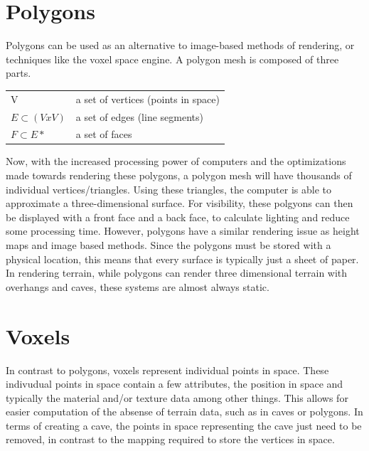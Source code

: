 \documentclass[10pt]{report}
\begin{document}
		\section{Polygons}
	
		Polygons can be used as an alternative to image-based methods of rendering, or techniques like the voxel space engine. A polygon mesh is composed of three parts.
		
		\begin{center}
			\begin{tabular}{ l l } 
				V & a set of vertices (points in space)\\ 
				$E {\subset} (V x V)$ & a set of edges (line segments)\\ 
				$F {\subset} E*$  & a set of faces \\
			\end{tabular}
		\end{center}
	
		Now, with the increased processing power of computers and the optimizations made towards rendering these polygons, a polygon mesh will have thousands of individual vertices/triangles. Using these triangles, the computer is able to approximate a three-dimensional surface. For visibility, these polgyons can then be displayed with a front face and a back face, to calculate lighting and reduce some processing time. However, polygons have a similar rendering issue as height maps and image based methods. Since the polygons must be stored with a physical location, this means that every surface is typically just a sheet of paper. In rendering terrain, while polygons can render three dimensional terrain with overhangs and caves, these systems are almost always static. 
		
	
		\section{Voxels}
	
		In contrast to polygons, voxels represent individual points in space. These indivudual points in space contain a few attributes, the position in space and typically the material and/or texture data among other things. This allows for easier computation of the absense of terrain data, such as in caves or polygons. In terms of creating a cave, the points in space representing the cave just need to be removed, in contrast to the mapping required to store the vertices in space. 
		
\end{document}
